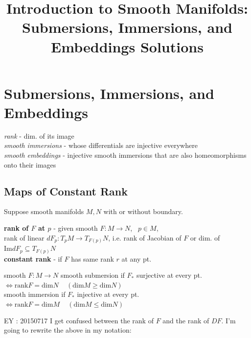 \documentclass[11pt]{amsart}
\title{Introduction to Smooth Manifolds: Submersions, Immersions, and Embeddings Solutions}
\theoremstyle{definition}
\begin{document}
\maketitle
\section{Submersions, Immersions, and Embeddings}




\emph{rank} - dim. of its image \\

\emph{smooth immersions} - whose differentials are injective everywhere \\
\emph{smooth embeddings} - injective smooth immersions that are also homeomorphisms onto their images

\subsection*{Maps of Constant Rank}

Suppose smooth manifolds $M,N$ with or without boundary.


\textbf{rank of $F$ at $p$ } - given smooth $F: M \to N$, \, $p\in M$, \\
\quad rank of linear $dF_p : T_pM \to T_{F(p)}N$, i.e. rank of Jacobian of $F$ or dim. of $\text{Im}{ dF_p} \subseteq T_{F(p)}N$ \\
\textbf{constant rank } - if $F$ has same rank $r$ at any pt.

smooth $F:M \to N$ smooth submersion if $F_*$ surjective at every pt.  $\Longleftrightarrow \text{rank}{F} = \text{dim}{N} \quad \, (\text{dim}{M} \geq \text{dim}{N})$ \\
\phantom{smooth $F:M \to N$} smooth immersion if $F_*$ injective at every pt. $\Longleftrightarrow \text{rank}{F} = \text{dim}{M} \quad \, (\text{dim}{M} \leq \text{dim}{N})$


EY : 20150717 I get confused between the rank of $F$ and the rank of $DF$.  I'm going to rewrite the above in my notation:
\end{document}
